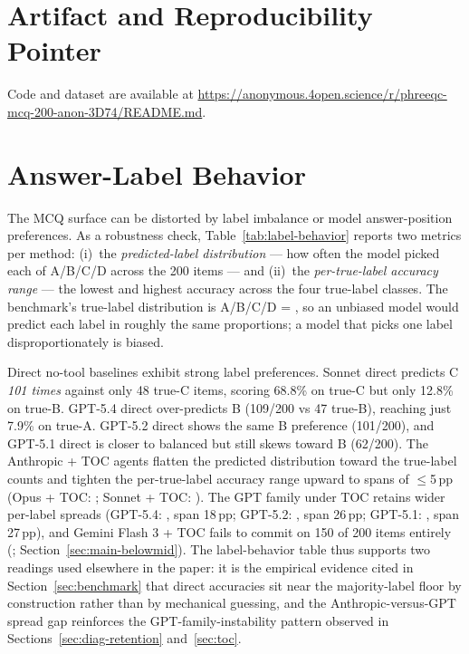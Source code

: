 \documentclass{article}
\begin{document}
\newpage
\appendix

\section{Artifact and Reproducibility Pointer}
\label{sec:appendix-artifact}

Code and dataset are available at \url{https://anonymous.4open.science/r/phreeqc-mcq-200-anon-3D74/README.md}.

\section{Answer-Label Behavior}
\label{sec:appendix-label-behavior}

The MCQ surface can be distorted by label imbalance or model answer-position preferences. As a robustness check, Table~\ref{tab:label-behavior} reports two metrics per method: (i)~the \emph{predicted-label distribution} --- how often the model picked each of A/B/C/D across the 200 items --- and (ii)~the \emph{per-true-label accuracy range} --- the lowest and highest accuracy across the four true-label classes. The benchmark's true-label distribution is A/B/C/D = \BenchTruthCounts, so an unbiased model would predict each label in roughly the same proportions; a model that picks one label disproportionately is biased.

Direct no-tool baselines exhibit strong label preferences. Sonnet direct predicts C \emph{101 times} against only 48 true-C items, scoring 68.8\% on true-C but only 12.8\% on true-B. GPT-5.4 direct over-predicts B (109/200 vs 47 true-B), reaching just 7.9\% on true-A. GPT-5.2 direct shows the same B preference (101/200), and GPT-5.1 direct is closer to balanced but still skews toward B (62/200). The Anthropic + TOC agents flatten the predicted distribution toward the true-label counts and tighten the per-true-label accuracy range upward to spans of $\le$5\,pp (Opus + TOC: \OpusTOCLabelRange; Sonnet + TOC: \SonnetTOCLabelRange). The GPT family under TOC retains wider per-label spreads (GPT-5.4: \GPTFiveFourTOCLabelRange{}, span 18\,pp; GPT-5.2: \GPTFiveTwoTOCLabelRange{}, span 26\,pp; GPT-5.1: \GPTFiveOneTOCLabelRange{}, span 27\,pp), and Gemini Flash 3 + TOC fails to commit on 150 of 200 items entirely (\GeminiThreeFlashTOCPredDist; Section~\ref{sec:main-belowmid}). The label-behavior table thus supports two readings used elsewhere in the paper: it is the empirical evidence cited in Section~\ref{sec:benchmark} that direct accuracies sit near the majority-label floor by construction rather than by mechanical guessing, and the Anthropic-versus-GPT spread gap reinforces the GPT-family-instability pattern observed in Sections~\ref{sec:diag-retention} and~\ref{sec:toc}.
\end{document}
